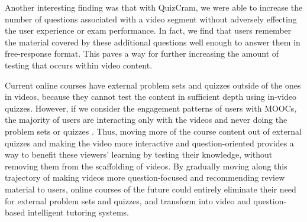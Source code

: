 \documentclass{sigchi}
\begin{document}
Another interesting finding was that with QuizCram, we were able to increase the number of questions associated with a video segment without adversely effecting the user experience or exam performance. In fact, we find that users remember the material covered by these additional questions well enough to answer them in free-response format. This paves a way for further increasing the amount of testing that occurs within video content.

Current online courses have external problem sets and quizzes outside of the ones in videos, because they cannot test the content in sufficient depth using in-video quizzes. However, if we consider the engagement patterns of users with MOOCs, the majority of users are interacting only with the videos and never doing the problem sets or quizzes \cite{anderson2014engaging}. Thus, moving more of the course content out of external quizzes and making the video more interactive and question-oriented provides a way to benefit these viewers' learning by testing their knowledge, without removing them from the scaffolding of videos. By gradually moving along this trajectory of making videos more question-focused and recommending review material to users, online courses of the future could entirely eliminate their need for external problem sets and quizzes, and transform into video and question-based intelligent tutoring systems.


\end{document}
